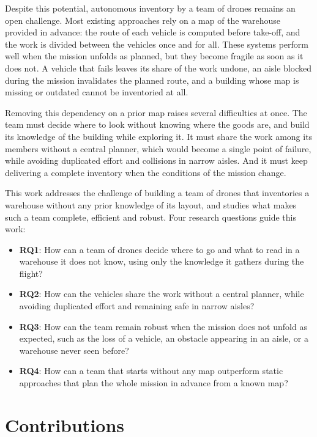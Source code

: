 Despite this potential, autonomous inventory by a team of drones remains an open
challenge. Most existing approaches rely on a map of the warehouse provided in
advance: the route of each vehicle is computed before take-off, and the work is
divided between the vehicles once and for all. These systems perform well when
the mission unfolds as planned, but they become fragile as soon as it does not. A
vehicle that fails leaves its share of the work undone, an aisle blocked during
the mission invalidates the planned route, and a building whose map is missing or
outdated cannot be inventoried at all.

Removing this dependency on a prior map raises several difficulties at once. The
team must decide where to look without knowing where the goods are, and build its
knowledge of the building while exploring it. It must share the work among its
members without a central planner, which would become a single point of failure,
while avoiding duplicated effort and collisions in narrow aisles. And it must
keep delivering a complete inventory when the conditions of the mission change.

This work addresses the challenge of building a team of drones that inventories a
warehouse without any prior knowledge of its layout, and studies what makes such
a team complete, efficient and robust. Four research questions guide this work:

\begin{itemize}[itemsep=0.4em]
    \item \textbf{RQ1}: How can a team of drones decide where to go and what to
          read in a warehouse it does not know, using only the knowledge it
          gathers during the flight?
    \item \textbf{RQ2}: How can the vehicles share the work without a central
          planner, while avoiding duplicated effort and remaining safe in narrow
          aisles?
    \item \textbf{RQ3}: How can the team remain robust when the mission does not
          unfold as expected, such as the loss of a vehicle, an obstacle appearing
          in an aisle, or a warehouse never seen before?
    \item \textbf{RQ4}: How can a team that starts without any map outperform
          static approaches that plan the whole mission in advance from a known
          map?
\end{itemize}

\section*{Contributions}

